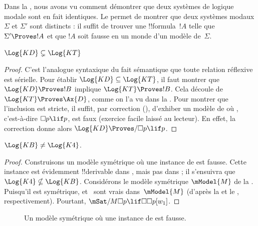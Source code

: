 \documentclass[../../../include/open-logic-section]{subfiles}
\begin{document}


Dans la , nous avons vu comment démontrer que deux
systèmes de logique modale sont en fait identiques. Le
 permet de montrer que deux systèmes modaux
$\Sigma$ et $\Sigma'$ sont distincts : il suffit de trouver une
!!{formula}~$!A$ telle que $\Sigma' \Proves !A$ et que $!A$ soit
fausse en un monde d'un modèle de~$\Sigma$.

\begin{prop}
  $\Log{KD} \subsetneq \Log{KT}$
\end{prop}

\begin{proof} C'est l'analogue syntaxique du fait sémantique que toute
  relation réflexive est sérielle. Pour établir $\Log{KD} \subseteq
  \Log{KT}$, il faut montrer que $\Log{KD} \Proves !B$ implique
  $\Log{KT} \Proves !B$. Cela découle de $\Log{KT} \Proves
  \Ax{D}$, comme on l'a vu dans la
  . Pour montrer
  que l'inclusion est stricte, il suffit, par correction
  (), d'exhiber un modèle de
   où , c'est-à-dire $\Box p \lif p$, est faux
  (exercice facile laissé au lecteur). En effet, la correction donne
  alors $\Log{KD} \Proves/ \Box p \lif p$.
\end{proof}

\begin{prop}
  $\Log{KB} \neq \Log{K4}$.
\end{prop}

\begin{proof}
  Construisons un modèle symétrique où une instance de  est
  fausse. Cette instance est évidemment !!{derivable} dans ,
  mais pas dans  ; il s'ensuivra que
  $\Log{K4} \nsubseteq \Log{KB}$. Considérons le modèle symétrique
  $\mModel{M}$ de la . Puisqu'il est symétrique,
   et~ sont vrais dans~$\mModel{M}$ (d'après la
   et le
  , respectivement). Pourtant,
  $\mSat/{M}{\Box p \lif \Box\Box p}[w_1]$.
\end{proof}

\begin{figure}[htpb]
  \centering
  \caption{Un modèle symétrique où une instance de  est fausse.}
\end{figure}
\end{document}
